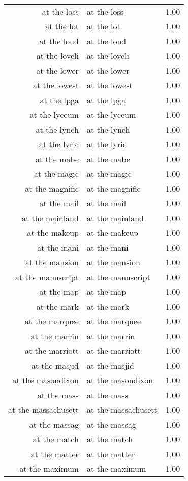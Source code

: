 \begin{table}[ht]
\begin{tabular}{rlr}
  at the loss & at the loss & 1.00 \\ 
  at the lot & at the lot & 1.00 \\ 
  at the loud & at the loud & 1.00 \\ 
  at the loveli & at the loveli & 1.00 \\ 
  at the lower & at the lower & 1.00 \\ 
  at the lowest & at the lowest & 1.00 \\ 
  at the lpga & at the lpga & 1.00 \\ 
  at the lyceum & at the lyceum & 1.00 \\ 
  at the lynch & at the lynch & 1.00 \\ 
  at the lyric & at the lyric & 1.00 \\ 
  at the mabe & at the mabe & 1.00 \\ 
  at the magic & at the magic & 1.00 \\ 
  at the magnific & at the magnific & 1.00 \\ 
  at the mail & at the mail & 1.00 \\ 
  at the mainland & at the mainland & 1.00 \\ 
  at the makeup & at the makeup & 1.00 \\ 
  at the mani & at the mani & 1.00 \\ 
  at the mansion & at the mansion & 1.00 \\ 
  at the manuscript & at the manuscript & 1.00 \\ 
  at the map & at the map & 1.00 \\ 
  at the mark & at the mark & 1.00 \\ 
  at the marquee & at the marquee & 1.00 \\ 
  at the marrin & at the marrin & 1.00 \\ 
  at the marriott & at the marriott & 1.00 \\ 
  at the masjid & at the masjid & 1.00 \\ 
  at the masondixon & at the masondixon & 1.00 \\ 
  at the mass & at the mass & 1.00 \\ 
  at the massachusett & at the massachusett & 1.00 \\ 
  at the massag & at the massag & 1.00 \\ 
  at the match & at the match & 1.00 \\ 
  at the matter & at the matter & 1.00 \\ 
  at the maximum & at the maximum & 1.00 \\ 

\end{tabular}
\end{table}
